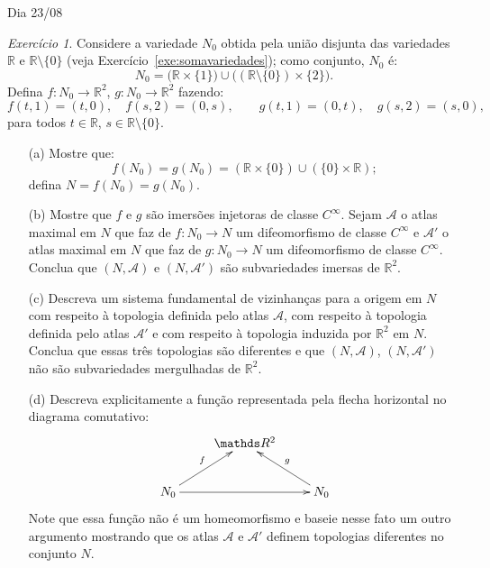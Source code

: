 \documentclass[oneside,11pt]{amsart}
\newcommand{\R}{\mathds R}
\theoremstyle{remark}\newtheorem{exercise}{Exercício}[section]
\theoremstyle{plain}\newtheorem{teo}{Teorema}[section]
\theoremstyle{plain}\newtheorem{lem}[teo]{Lema}
\theoremstyle{plain}\newtheorem{prop}[teo]{Proposição}
\theoremstyle{definition}\newtheorem{defin}[teo]{Definição}
\theoremstyle{remark}\newtheorem{rem}[teo]{Observação}
\theoremstyle{definition}\newtheorem{example}[teo]{Exemplo}
\numberwithin{equation}{section}
\begin{document}
\begin{section}{Dia 23/08}
\begin{exercise}\label{exe:maisimerso}
Considere a variedade $N_0$ obtida pela união disjunta das variedades $\R$ e $\R\setminus\{0\}$ (veja Exercício~\ref{exe:somavariedades});
como conjunto, $N_0$ é:
\[N_0=\big(\R\times\{1\}\!\big)\cup\big((\R\setminus\{0\})\times\{2\}\!\big).\]
Defina $f:N_0\to\R^2$, $g:N_0\to\R^2$ fazendo:
\[f(t,1)=(t,0),\quad f(s,2)=(0,s),\qquad g(t,1)=(0,t),\quad g(s,2)=(s,0),\]
para todos $t\in\R$, $s\in\R\setminus\{0\}$.
\begin{itemize}
\item[(a)] Mostre que:
\[f(N_0)=g(N_0)=(\R\times\{0\})\cup(\{0\}\times\R);\]
defina $N=f(N_0)=g(N_0)$.
\item[(b)] Mostre que $f$ e $g$ são imersões injetoras de classe $C^\infty$. Sejam $\mathcal A$ o atlas maximal em $N$ que faz de
$f:N_0\to N$ um difeomorfismo de classe $C^\infty$ e $\mathcal A'$ o atlas maximal em $N$ que faz de $g:N_0\to N$ um difeomorfismo de classe $C^\infty$.
Conclua que $(N,\mathcal A)$ e $(N,\mathcal A')$ são subvariedades imersas de $\R^2$.
\item[(c)] Descreva um sistema fundamental de vizinhanças para a origem em $N$ com respeito à topologia definida pelo atlas $\mathcal A$,
com respeito à topologia definida pelo atlas $\mathcal A'$ e com respeito à topologia induzida por $\R^2$ em $N$. Conclua que essas três topologias
são diferentes e que $(N,\mathcal A)$, $(N,\mathcal A')$ não são subvariedades mergulhadas de $\R^2$.
\item[(d)] Descreva explicitamente a função representada pela flecha horizontal no diagrama comutativo:
\[\xymatrix{%
&\R^2\\
N_0\ar[ur]^f\ar[rr]&&N_0\ar[ul]_g}\]
Note que essa função não é um homeomorfismo e baseie nesse fato um outro argumento mostrando que os atlas $\mathcal A$ e $\mathcal A'$ definem topologias diferentes
no conjunto $N$.
\end{itemize}
\end{exercise}

\end{section}
\end{document}

